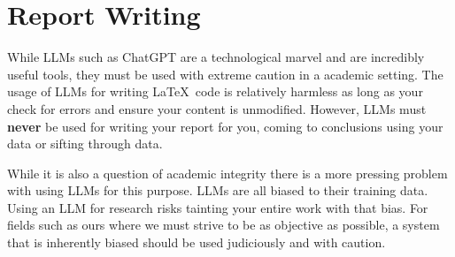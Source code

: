 \chapter{Report Writing}
\begin{tcolorbox}[colback=red!5!white,colframe=darkred!75!black,title={\large \textbf{An Advisory on ChatGPT and other LLMs}}]
	While LLMs such as ChatGPT are a technological marvel and are incredibly useful tools, they must be used with extreme caution in a academic setting. The usage of LLMs for writing \LaTeX\ code is relatively harmless as long as your check for errors and ensure your content is unmodified. However, LLMs must \textbf{never} be used for writing your report for you, coming to conclusions using your data or sifting through data. \bigskip

	While it is also a question of academic integrity there is a more pressing problem with using LLMs for this purpose. LLMs are all biased to their training data. Using an LLM for research risks tainting your entire work with that bias. For fields such as ours where we must strive to be as objective as possible, a system that is inherently biased should be used judiciously and with caution.
\end{tcolorbox}
